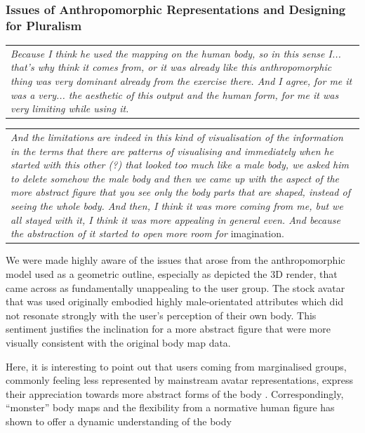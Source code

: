 \subsubsection{Issues of Anthropomorphic Representations and Designing for Pluralism}

\begin{center}
\begin{tabular}{ p{13cm}}
\textit{Because I think he used the mapping on the human body, so in this sense I... that's why  think it comes from, or it was already like this anthropomorphic thing was very dominant already from the exercise there. And I agree, for me it was a very... the aesthetic of this output and the human form, for me it was very limiting while using it.}
\end{tabular}
\end{center}

\begin{center}
\begin{tabular}{ p{13cm}}
\textit{And the limitations are indeed in this kind of visualisation of the information in the terms that there are patterns of visualising and immediately when he started with this other (?) that looked too much like a male body, we asked him to delete somehow the male body and then we came up with the aspect of the more abstract figure that you see only the body parts that are shaped, instead of seeing the whole body. And then, I think it was more coming from me, but we all stayed with it, I think it was more appealing in general even. And because the abstraction of it started to open more room for} imagination.
\end{tabular}
\end{center}

We were made highly aware of the issues that arose from the anthropomorphic model used as a geometric outline, especially as depicted the 3D render, that came across as fundamentally unappealing to the user group. The stock avatar that was used originally embodied highly male-orientated attributes which did not resonate strongly with the user's perception of their own body. This sentiment justifies the inclination for a more abstract figure that were more visually consistent with the original body map data.

Here, it is interesting to point out that users coming from marginalised groups, commonly feeling less represented by mainstream avatar representations, express their appreciation towards more abstract forms of the body \cite{niehaus_making_2021}. Correspondingly, ``monster'' body maps and the flexibility from a normative human figure has shown to offer a dynamic understanding of the body \cite{hook_soma_2019}

